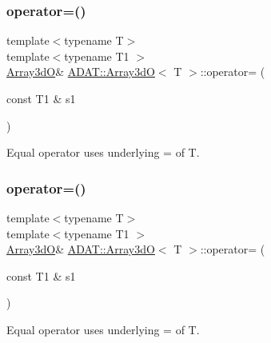 \subsubsection{\texorpdfstring{operator=()}{operator=()}\hspace{0.1cm}{\footnotesize\ttfamily [5/6]}}
{\footnotesize\ttfamily template$<$typename T$>$ \\
template$<$typename T1 $>$ \\
\mbox{\hyperlink{classADAT_1_1Array3dO}{Array3dO}}\& \mbox{\hyperlink{classADAT_1_1Array3dO}{A\+D\+A\+T\+::\+Array3dO}}$<$ T $>$\+::operator= (\begin{DoxyParamCaption}\item[{const T1 \&}]{s1 }\end{DoxyParamCaption})\hspace{0.3cm}{\ttfamily [inline]}}



Equal operator uses underlying = of T. 

\mbox{\label{classADAT_1_1Array3dO_a7f1b73e1e34cf1e21dfac8af86469ee1}} 
\subsubsection{\texorpdfstring{operator=()}{operator=()}\hspace{0.1cm}{\footnotesize\ttfamily [6/6]}}
{\footnotesize\ttfamily template$<$typename T$>$ \\
template$<$typename T1 $>$ \\
\mbox{\hyperlink{classADAT_1_1Array3dO}{Array3dO}}\& \mbox{\hyperlink{classADAT_1_1Array3dO}{A\+D\+A\+T\+::\+Array3dO}}$<$ T $>$\+::operator= (\begin{DoxyParamCaption}\item[{const T1 \&}]{s1 }\end{DoxyParamCaption})\hspace{0.3cm}{\ttfamily [inline]}}



Equal operator uses underlying = of T. 

\mbox{\label{classADAT_1_1Array3dO_a7ad48358af907cbaf3cf50fad298a088}} 
